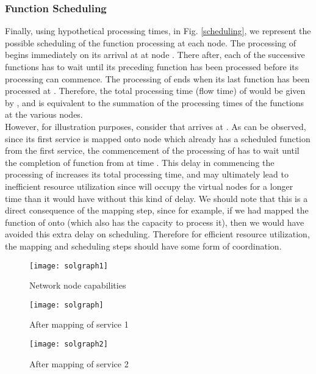 \documentclass[conference]{IEEEtran}
\begin{document}
\subsubsection{Function Scheduling}\label{schedex}
Finally, using hypothetical processing times, in Fig. \ref{scheduling}, we represent the possible scheduling of the function processing at each node. The processing of  begins immediately on its arrival at  at node . There after, each of the successive functions has to wait until its preceding function has been processed before its processing can commence. The processing of  ends when its last function has been processed at . Therefore, the total processing time (flow time) of  would be given by , and is equivalent to the summation of the processing times of the functions at the various nodes.\\
\indent However, for illustration purposes, consider that  arrives at . As can be observed, since its first service is mapped onto node  which already has a scheduled function from the first service, the commencement of the processing of  has to wait until the completion of function  from  at time . This delay  in commencing the processing of  increases its total processing time, and may ultimately lead to inefficient resource utilization since  will occupy the virtual nodes for a longer time than it would have without this kind of delay. We should note that this is a direct consequence of the mapping step, since for example, if we had mapped the function  of  onto  (which also has the capacity to process it), then we would have avoided this extra delay on scheduling. Therefore for efficient resource utilization, the mapping and scheduling steps should have some form of coordination.
\begin{figure*}[t]
\setlength{\abovecaptionskip}{7pt plus 0pt minus 0pt}
\setlength{\belowcaptionskip}{-5pt plus 0pt minus 0pt}
\begin{minipage}{.33\textwidth}
\centering
\resizebox{.99\textwidth}{!}
{\texttt{[image: solgraph1]}}
  \caption{\scriptsize Network node capabilities}
  \label{state1}
\end{minipage}
\begin{minipage}{.33\textwidth}
\centering
\resizebox{0.99\textwidth}{!}
{\texttt{[image: solgraph]}}
  \caption{\scriptsize After mapping of service 1}
  \label{state2}
\end{minipage}
\begin{minipage}{.33\textwidth}
\centering
\resizebox{0.99\textwidth}{!}
{\texttt{[image: solgraph2]}}
  \caption{\scriptsize After mapping of service 2}
  \label{state3}
\end{minipage}
\end{figure*}
\end{document}
